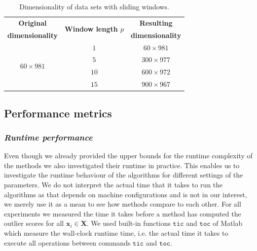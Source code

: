 \begin{table}[h]
	\centering
	\caption{Dimensionality of data sets with sliding windows.}
	\label{tab:analysis_datasets}
	\begin{tabular}{ c c c }
		\toprule	
		\textbf{Original} & \multirow{2}{*}{\textbf{Window length $p$}}  & \textbf{Resulting} \\
		\textbf{dimensionality} & & \textbf{dimensionality} \\
		\midrule
		\multirow{4}{*}{$60 \times 981$} & $1$ 	& $60 \times 981 $ 	\\
									 	 & $5$ 	& $300 \times 977$	\\
										 & $10$	& $600 \times 972$ 	\\
										 & $15$	& $900 \times 967$ 	\\
		\bottomrule
	\end{tabular}
\end{table}


\subsection{Performance metrics}

\subsubsection{\textit{Runtime performance}}

Even though we already provided the upper bounds for the runtime complexity of the methods we also investigated their runtime in practice. This enables us to investigate the runtime behaviour of the algorithms for different settings of the parameters. We do not interpret the actual time that it takes to run the algorithms as that depends on machine configurations and is not in our interest, we merely use it as a mean to see how methods compare to each other. For all experiments we measured the time it takes before a method has computed the outlier scores for all $\mathbf{x}_i \in \mathbf{X}$. We used built-in functions $\texttt{tic}$ and $\texttt{toc}$ of Matlab which measure the wall-clock runtime time, i.e. the actual time it takes to execute all operations between commands $\texttt{tic}$ and $\texttt{toc}$. 

